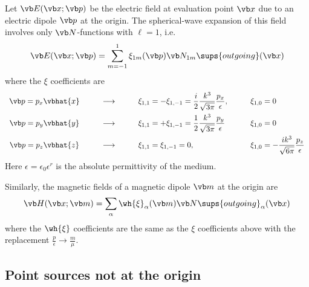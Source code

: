 \documentclass[letterpaper]{article}
\begin{document}
Let $\vb E(\vb x; \vb p)$ be the electric field
at evaluation point $\vb x$ due to an electric dipole
$\vb p$ at the origin. The spherical-wave expansion
of this field involves only $\vb N$-functions
with $\ell=1$, i.e.
$$ \vb E(\vb x; \vb p) = 
   \sum_{m=-1}^1 \xi_{1m}(\vb p) \vb N_{1m}\sups{outgoing}(\vb x)
$$
where the $\xi$ coefficients are
$$\begin{array}{clll}
\vb p=p_x \vbhat{x}
&\qquad\longrightarrow\qquad
&\displaystyle{
  \xi_{1,1}=-\xi_{1,-1}=\frac{i}{2}\frac{k^3}{\sqrt{3\pi}}\frac{p_x}{\epsilon},
              }
&\qquad\xi_{1,0}=0
\\[10pt]
\vb p=p_y \vbhat{y}
&\qquad\longrightarrow\qquad
&\displaystyle{
 \xi_{1,1}=+\xi_{1,-1}=\frac{1}{2}\frac{k^3}{\sqrt{3\pi}}\frac{p_y}{\epsilon}
              }
&\qquad\xi_{1,0}=0
\\[10pt]
\vb p=p_z \vbhat{z}
&\qquad\longrightarrow\qquad
&\displaystyle{
 \xi_{1,1}=\xi_{1,-1}=0, 
              } 
&\qquad \xi_{1,0} = 
  \displaystyle{ -\frac{ik^3}{\sqrt{6\pi}} \frac{p_z}{\epsilon} }
\end{array}$$
Here $\epsilon=\epsilon_0\epsilon^r$ is the absolute permittivity
of the medium.

Similarly, the magnetic fields of a magnetic dipole $\vb m$ at the
origin are
$$ \vb H(\vb x; \vb m)=\sum_\alpha \wh{\xi}_\alpha(\vb m) \vb N\sups{outgoing}_\alpha(\vb x)
$$
where the $\wh{\xi}$ coefficients are the same as the
$\xi$ coefficients above with the replacement
$\frac{p}{\epsilon} \to \frac{m}{\mu}.$

\subsection{Point sources not at the origin}
\label{PointSourceSection}
\end{document}
